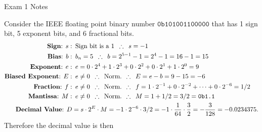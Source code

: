 \begin{examnotes}{Exam 1 Notes}
    \begin{highlight}
        Consider the IEEE floating point binary number $\texttt{0b101001100000}$ that has 1 sign bit, 5 exponent bits, and 6 fractional bits.
        \begin{align*}
            \text{\textbf{Sign}: } s: & \hspace*{5pt} \text{Sign bit is a 1} \hspace*{5pt} \therefore \hspace*{5pt} s = -1 \\
            \text{\textbf{Bias}: } b: & \hspace*{5pt} b_{n} = 5 \hspace*{5pt} \therefore \hspace*{5pt} b = 2^{5 - 1} - 1 = 2^{4} - 1 = 16 - 1 = 15 \\
            \text{\textbf{Exponent}: } e: & \hspace*{5pt} e = 0 \cdot 2^{4} + 1 \cdot 2^{3} + 0 \cdot 2^{2} + 0 \cdot 2^{1} + 1 \cdot 2^{0} = 9 \\
            \text{\textbf{Biased Exponent}: } E: & \hspace*{5pt} e \neq 0 \hspace*{5pt} \therefore \hspace*{5pt} \text{Norm. } \therefore \hspace*{5pt} E = e - b = 9 - 15 = -6 \\
            \text{\textbf{Fraction}: } f: & \hspace*{5pt} e \neq 0 \hspace*{5pt} \therefore \hspace*{5pt} \text{Norm. } \therefore \hspace*{5pt} f = 1 \cdot 2^{-1} + 0 \cdot 2^{-2} + \dots + 0 \cdot 2^{-6} = 1/2 \\
            \text{\textbf{Mantissa}: } M: & \hspace*{5pt} e \neq 0 \hspace*{5pt} \therefore \hspace*{5pt} \text{Norm. } \therefore \hspace*{5pt} M = 1 + 1 / 2 = 3 / 2 = \texttt{0b1.1} \\
            \text{\textbf{Decimal Value}: } D & = s \cdot 2^{E} \cdot M = -1 \cdot 2^{-6} \cdot 3 / 2 = -1 \cdot \frac{1}{64} \cdot \frac{3}{2} = -\frac{3}{128} = -0.0234375.
        \end{align*}
        Therefore the decimal value is then


\end{highlight}
\end{examnotes}
